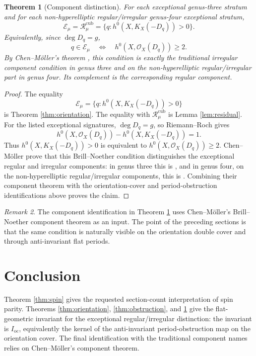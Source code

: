 \documentclass[11pt]{article}
\newtheorem{theorem}{Theorem}[section]
\theoremstyle{remark}
\newtheorem{remark}[theorem]{Remark}
\newcommand{\OO}{\mathcal O}
\newcommand{\Ioc}{I_{\mathrm{oc}}}
\newcommand{\Rcub}{\mathcal R^{\mathrm{cub}}}
\newcommand{\EE}{\mathcal E}
\begin{document}
\begin{theorem}[Component distinction]\label{thm:component}
For each exceptional genus-three stratum and for each
non-hyperelliptic regular/irregular genus-four exceptional stratum,
\[
\EE_\mu=\Rcub_\mu=\{q:h^0(X,K_X(-D_q))>0\}.
\]
Equivalently, since $\deg D_q=g$,
\[
q\in\EE_\mu\quad\Longleftrightarrow\quad h^0(X,\OO_X(D_q))\geq 2.
\]
By Chen--M\"oller's theorem \cite[Theorems 6.1 and 7.1]{ChenMoller}, this condition is exactly the traditional
irregular component condition in genus three and on the non-hyperelliptic regular/irregular part
in genus four. Its complement is the corresponding regular component.
\end{theorem}
\begin{proof}
The equality
\[
\EE_\mu=\{q:h^0(X,K_X(-D_q))>0\}
\]
is Theorem \ref{thm:orientation}. The equality with $\Rcub_\mu$ is Lemma \ref{lem:residual}. For the listed exceptional signatures,
$\deg D_q=g$, so Riemann--Roch gives
\[
h^0(X,\OO_X(D_q))-h^0(X,K_X(-D_q))=1.
\]
Thus $h^0(X,K_X(-D_q))>0$ is equivalent to $h^0(X,\OO_X(D_q))\geq 2$. Chen--M\"oller prove that this
Brill--Noether condition distinguishes the exceptional regular and irregular components: in genus
three this is \cite[Theorem 6.1]{ChenMoller}, and in genus four, on the non-hyperelliptic regular/irregular
components, this is \cite[Theorem 7.1]{ChenMoller}. Combining their component theorem with the orientation-cover
and period-obstruction identifications above proves the claim.
\end{proof}

\begin{remark}
The component identification in Theorem \ref{thm:component} uses Chen--M\"oller's Brill--Noether
component theorem as an input. The point of the preceding sections is that the same condition
is naturally visible on the orientation double cover and through anti-invariant flat periods.
\end{remark}

\section{Conclusion}
Theorem \ref{thm:spin} gives the requested section-count interpretation of spin parity. Theorems \ref{thm:orientation}, \ref{thm:obstruction},
and \ref{thm:component} give the flat-geometric invariant for the exceptional regular/irregular distinction: the invariant
is $\Ioc$, equivalently the kernel of the anti-invariant period-obstruction map on the orientation
cover. The final identification with the traditional component names relies on Chen--M\"oller's
component theorem.
\end{document}
